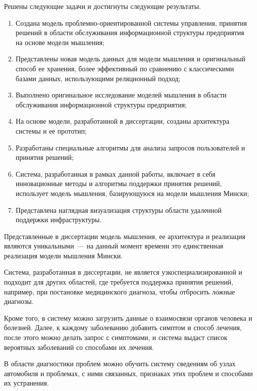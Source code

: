 
Решены следующие задачи и достигнуты следующие результаты.
\begin{enumerate}
  \item Создана модель проблемно-ориентированной системы управления, принятия решений в области обслуживания информационной структуры предприятия на основе модели мышления;
  \item Представлены новая модель данных для модели мышления и оригинальный способ ее хранения, более эффективный по сравнению с классическими базами данных, использующими реляционный подход;
  \item Выполнено оригинальное исследование моделей мышления в области обслуживания информационной структуры предприятия;
  \item На основе модели, разработанной в диссертации, созданы архитектура системы и ее прототип; 
  \item Разработаны специальные алгоритмы для анализа запросов пользователей и принятия решений;
  \item Система, разработанная в рамках данной работы, включает в себя инновационные методы и алгоритмы поддержки принятия решений, использует модель мышления, базирующуюся на модели мышления Мински;
  \item Представлена наглядная визуализация структуры области удаленной поддержки инфраструктуры.
\end{enumerate}

Представленные в диссертации модель мышления, ее архитектура и реализация являются уникальными~--- на данный момент времени это единственная реализация модели мышления Мински. \par
Система, разработанная в диссертации, не является узкоспециализированной и подходит для других областей, где требуется поддержка принятия решений, например, при постановке медицинского диагноза, чтобы отбросить ложные диагнозы. \par
Кроме того, в систему можно загрузить данные о взаимосвязи органов человека и болезней. Далее, к каждому заболеванию добавить симптом и способ лечения, после этого можно делать запрос с симптомами, и система выдаст список вероятных заболеваний со способами их лечения. \par
В области диагностики проблем можно обучить систему сведениям об узлах автомобиля и проблемах, с ними связанных, признаках этих проблем и способами их устранения. 




